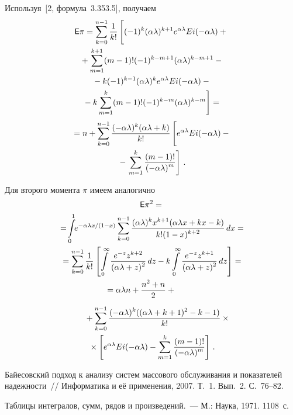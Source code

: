 \begin{multicols}{2}
Используя~[2, формула~3.353.5], получаем
\begin{multline*}
\e\pi=
\sum_{k=0}^{n-1}\fr{1}{k!}\left[
\vphantom{\sum_{m=1}^{k+1}}
(-1)^k(\alpha\lambda)^{k+1}e^{\alpha\lambda}Ei(-\alpha\lambda)+{}\right.\\
{}+\sum_{m=1}^{k+1}
(m-1)!(-1)^{k-m+1}(\alpha\lambda)^{k-m+1}-{}\\
{}-k(-1)^{k-1}(\alpha\lambda)^ke^{\alpha\lambda}Ei(-\alpha\lambda)-{}\\
\left.{}-k\sum_{m=1}^k(m-1)!(-1)^{k-m}(\alpha\lambda)^{k-m}
\right]={}
\end{multline*}
\begin{multline*}
{}
=n+\sum_{k=0}^{n-1}\displaystyle\frac{\displaystyle (-\alpha\lambda)^k(\alpha\lambda+k)\mathstrut}{\displaystyle k!\mathstrut}\left[\vphantom{\sum\limits_m^k}e^{\alpha\lambda}Ei(-\alpha\lambda)-{}\right.\\
{}- \left.
\sum_{m=1}^{k}\displaystyle\frac{\displaystyle (m-1)!\mathstrut}{\displaystyle (-\alpha\lambda)^m\mathstrut}\right]\,.
\end{multline*}

Для второго момента $\pi$ имеем аналогично
\begin{multline*}
\e\pi^2={}\\
{}=\!\il{0}{1}\!\!e^{-{\alpha\lambda x}/(1-x)}\sum\limits_{k=0}^{n-1}\fr{(\alpha\lambda)^k x^{k+1}(\alpha\lambda
x+kx-k)}{k!(1-x)^{k+2}}\, dx={}\\
{}=\sum\limits_{k=0}^{n-1}\fr{1}{k!}\left[\il{0}{\infty}\fr{e^{-z}z^{k+2}}{(\alpha\lambda+z)^2}\,
dz-k\il{0}{\infty}\fr{e^{-z}z^{k+1}}{(\alpha\lambda+z)^2}\, dz\right]={}\\
{}=\alpha\lambda n+\fr{n^2+n}{2}+{}\hspace*{10mm}
\end{multline*}
\begin{multline*}
\hspace*{5mm}{}+\sum\limits_{k=0}^{n-1}\displaystyle\frac{\displaystyle (-\alpha\lambda)^k((\alpha\lambda+k+1)^2-k-1)\mathstrut}{\displaystyle k!\mathstrut}\times{}\\
{}\times\left[e^{\alpha\lambda}Ei(-\alpha\lambda)-\sum\limits_{m=1}^k\displaystyle\frac{\displaystyle (m-1)!\mathstrut}{\displaystyle (-\alpha\lambda)^m\mathstrut}\right]\,.
\end{multline*}

{\small\frenchspacing
{%
\begin{thebibliography}{9}

Байесовский подход к анализу систем массового обслуживания и показателей надежности~// Информатика и её 
применения, 2007. Т.~1. Вып.~2. С.~76--82.

 \label{end\stat}
 

Таблицы интегралов, сумм, рядов и произведений.~--- М.: Наука, 1971. 1108~с.
 \end{thebibliography}
}
}


\end{multicols}  